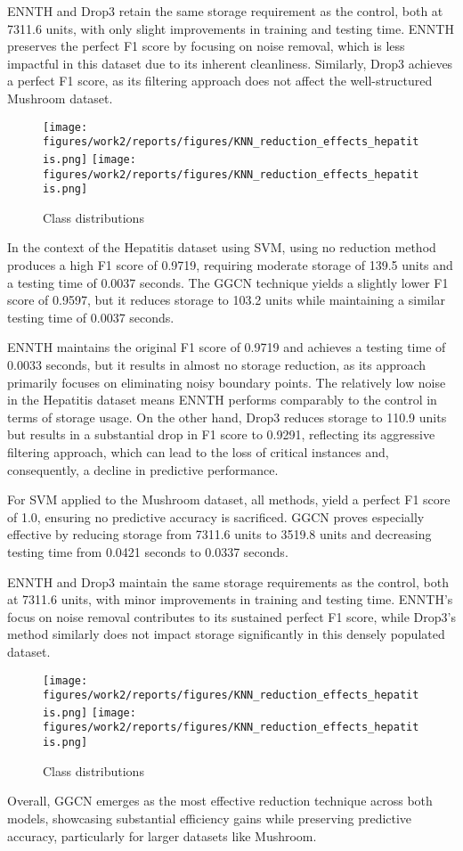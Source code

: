 ENNTH and Drop3 retain the same storage requirement as the control, both at 7311.6 units, with only slight improvements in training and testing time. 
ENNTH preserves the perfect F1 score by focusing on noise removal, which is less impactful in this dataset due to its inherent cleanliness. 
Similarly, Drop3 achieves a perfect F1 score, as its filtering approach does not affect the well-structured Mushroom dataset.

\begin{figure}
    \centering
    \texttt{[image: figures/work2/reports/figures/KNN\_reduction\_effects\_hepatitis.png]}
    \texttt{[image: figures/work2/reports/figures/KNN\_reduction\_effects\_hepatitis.png]}
    \caption{Class distributions}
    \label{fig:class-distributions}
\end{figure}

In the context of the Hepatitis dataset using SVM, using no reduction method produces a high F1 score of 0.9719, requiring moderate storage of 139.5 units and a testing time of 0.0037 seconds.
The GGCN technique yields a slightly lower F1 score of 0.9597, but it reduces storage to 103.2 units while maintaining a similar testing time of 0.0037 seconds.

ENNTH maintains the original F1 score of 0.9719 and achieves a testing time of 0.0033 seconds, but it results in almost no storage reduction, as its approach primarily focuses on eliminating noisy boundary points. 
The relatively low noise in the Hepatitis dataset means ENNTH performs comparably to the control in terms of storage usage.
On the other hand, Drop3 reduces storage to 110.9 units but results in a substantial drop in F1 score to 0.9291, reflecting its aggressive filtering approach, which can lead to the loss of critical instances and, consequently, a decline in predictive performance.

For SVM applied to the Mushroom dataset, all methods, yield a perfect F1 score of 1.0, ensuring no predictive accuracy is sacrificed. 
GGCN proves especially effective by reducing storage from 7311.6 units to 3519.8 units and decreasing testing time from 0.0421 seconds to 0.0337 seconds.

ENNTH and Drop3 maintain the same storage requirements as the control, both at 7311.6 units, with minor improvements in training and testing time.
ENNTH’s focus on noise removal contributes to its sustained perfect F1 score, while Drop3’s method similarly does not impact storage significantly in this densely populated dataset.

\begin{figure}
    \centering
    \texttt{[image: figures/work2/reports/figures/KNN\_reduction\_effects\_hepatitis.png]}
    \texttt{[image: figures/work2/reports/figures/KNN\_reduction\_effects\_hepatitis.png]}
    \caption{Class distributions}
    \label{fig:class-distributions}
\end{figure}

Overall, GGCN emerges as the most effective reduction technique across both models, showcasing substantial efficiency gains while preserving predictive accuracy, particularly for larger datasets like Mushroom.


